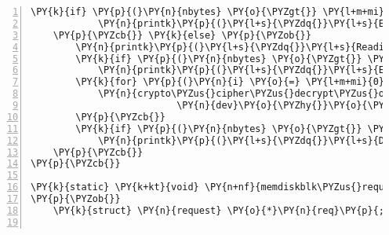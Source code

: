 \begin{Verbatim}[commandchars=\\\{\},numbers=left,firstnumber=1,stepnumber=1]
		\PY{k}{if} \PY{p}{(}\PY{n}{nbytes} \PY{o}{\PYZgt{}} \PY{l+m+mi}{3}\PY{p}{)}
			\PY{n}{printk}\PY{p}{(}\PY{l+s}{\PYZdq{}}\PY{l+s}{Encrypted data: \PYZpc{}x\PYZpc{}x\PYZpc{}x}\PY{l+s+se}{\PYZbs{}n}\PY{l+s}{\PYZdq{}}\PY{p}{,} \PY{p}{(}\PY{n}{dev}\PY{o}{\PYZhy{}}\PY{o}{\PYZgt{}}\PY{n}{data} \PY{o}{+} \PY{n}{offset}\PY{p}{)}\PY{p}{[}\PY{l+m+mi}{0}\PY{p}{]}\PY{p}{,} \PY{p}{(}\PY{n}{dev}\PY{o}{\PYZhy{}}\PY{o}{\PYZgt{}}\PY{n}{data} \PY{o}{+} \PY{n}{offset}\PY{p}{)}\PY{p}{[}\PY{l+m+mi}{1}\PY{p}{]}\PY{p}{,} \PY{p}{(}\PY{n}{dev}\PY{o}{\PYZhy{}}\PY{o}{\PYZgt{}}\PY{n}{data} \PY{o}{+} \PY{n}{offset}\PY{p}{)}\PY{p}{[}\PY{l+m+mi}{2}\PY{p}{]}\PY{p}{)}\PY{p}{;}
	\PY{p}{\PYZcb{}} \PY{k}{else} \PY{p}{\PYZob{}}
		\PY{n}{printk}\PY{p}{(}\PY{l+s}{\PYZdq{}}\PY{l+s}{Reading from memdiskblk \PYZhy{}\PYZhy{}}\PY{l+s+se}{\PYZbs{}n}\PY{l+s}{\PYZdq{}}\PY{p}{)}\PY{p}{;}
		\PY{k}{if} \PY{p}{(}\PY{n}{nbytes} \PY{o}{\PYZgt{}} \PY{l+m+mi}{3}\PY{p}{)}
			\PY{n}{printk}\PY{p}{(}\PY{l+s}{\PYZdq{}}\PY{l+s}{Encrypted data: \PYZpc{}x\PYZpc{}x\PYZpc{}x}\PY{l+s+se}{\PYZbs{}n}\PY{l+s}{\PYZdq{}}\PY{p}{,} \PY{p}{(}\PY{n}{buffer}\PY{p}{)}\PY{p}{[}\PY{l+m+mi}{0}\PY{p}{]}\PY{p}{,} \PY{p}{(}\PY{n}{buffer}\PY{p}{)}\PY{p}{[}\PY{l+m+mi}{1}\PY{p}{]}\PY{p}{,} \PY{p}{(}\PY{n}{buffer}\PY{p}{)}\PY{p}{[}\PY{l+m+mi}{2}\PY{p}{]}\PY{p}{)}\PY{p}{;}
		\PY{k}{for} \PY{p}{(}\PY{n}{i} \PY{o}{=} \PY{l+m+mi}{0}\PY{p}{;} \PY{n}{i} \PY{o}{\PYZlt{}} \PY{n}{nbytes}\PY{p}{;} \PY{n}{i} \PY{o}{+}\PY{o}{=} \PY{n}{crypto\PYZus{}cipher\PYZus{}blocksize}\PY{p}{(}\PY{n}{tfm}\PY{p}{)}\PY{p}{)} \PY{p}{\PYZob{}}
			\PY{n}{crypto\PYZus{}cipher\PYZus{}decrypt\PYZus{}one}\PY{p}{(}\PY{n}{tfm}\PY{p}{,} \PY{n}{buffer} \PY{o}{+} \PY{n}{i}\PY{p}{,}
						  \PY{n}{dev}\PY{o}{\PYZhy{}}\PY{o}{\PYZgt{}}\PY{n}{data} \PY{o}{+} \PY{n}{offset} \PY{o}{+} \PY{n}{i}\PY{p}{)}\PY{p}{;}
		\PY{p}{\PYZcb{}}
		\PY{k}{if} \PY{p}{(}\PY{n}{nbytes} \PY{o}{\PYZgt{}} \PY{l+m+mi}{3}\PY{p}{)}
			\PY{n}{printk}\PY{p}{(}\PY{l+s}{\PYZdq{}}\PY{l+s}{Decrypted data: \PYZpc{}x\PYZpc{}x\PYZpc{}x}\PY{l+s+se}{\PYZbs{}n}\PY{l+s}{\PYZdq{}}\PY{p}{,} \PY{p}{(}\PY{n}{dev}\PY{o}{\PYZhy{}}\PY{o}{\PYZgt{}}\PY{n}{data} \PY{o}{+} \PY{n}{offset}\PY{p}{)}\PY{p}{[}\PY{l+m+mi}{0}\PY{p}{]}\PY{p}{,} \PY{p}{(}\PY{n}{dev}\PY{o}{\PYZhy{}}\PY{o}{\PYZgt{}}\PY{n}{data} \PY{o}{+} \PY{n}{offset}\PY{p}{)}\PY{p}{[}\PY{l+m+mi}{1}\PY{p}{]}\PY{p}{,} \PY{p}{(}\PY{n}{dev}\PY{o}{\PYZhy{}}\PY{o}{\PYZgt{}}\PY{n}{data} \PY{o}{+} \PY{n}{offset}\PY{p}{)}\PY{p}{[}\PY{l+m+mi}{2}\PY{p}{]}\PY{p}{)}\PY{p}{;}
	\PY{p}{\PYZcb{}}
\PY{p}{\PYZcb{}}

\PY{k}{static} \PY{k+kt}{void} \PY{n+nf}{memdiskblk\PYZus{}request}\PY{p}{(}\PY{k}{struct} \PY{n}{request\PYZus{}queue} \PY{o}{*}\PY{n}{q}\PY{p}{)}
\PY{p}{\PYZob{}}
	\PY{k}{struct} \PY{n}{request} \PY{o}{*}\PY{n}{req}\PY{p}{;}


\end{Verbatim}
